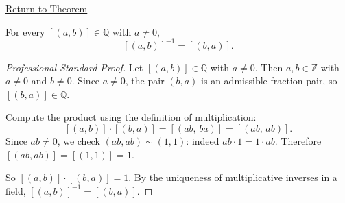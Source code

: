 \newpage
{}
\label{prf:ec-reciprocal}

\begin{remark*}[Return]
\hyperref[thm:ec-reciprocal]{Return to Theorem}
\end{remark*}

\begin{theorem*}
For every $[(a,b)]\in\mathbb{Q}$ with $a\neq 0$,
\[
[(a,b)]^{-1} = [(b,a)].
\]
\end{theorem*}

\begin{proof}[Professional Standard Proof]
\LRAProofBodyStart
Let $[(a,b)]\in\mathbb{Q}$ with $a\neq 0$. Then $a,b\in\mathbb{Z}$ with
$a\neq 0$ and $b\neq 0$. Since $a\neq 0$, the pair $(b,a)$ is an
admissible fraction-pair, so $[(b,a)]\in\mathbb{Q}$.

Compute the product using the definition of multiplication:
\[
[(a,b)]\cdot[(b,a)]
= [(ab,\,ba)]
= [(ab,\,ab)].
\]
Since $ab \neq 0$, we check $(ab,ab)\sim(1,1)$: indeed $ab\cdot 1 = 1\cdot ab$.
Therefore $[(ab,ab)] = [(1,1)] = 1$.

So $[(a,b)]\cdot[(b,a)] = 1$. By the uniqueness of multiplicative inverses
in a field, $[(a,b)]^{-1} = [(b,a)]$.
\end{proof}

